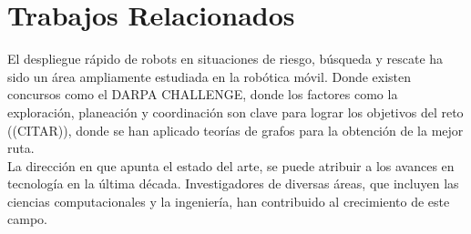 \documentclass[sigconf]{acmart}
\begin{document}

\section{Trabajos Relacionados}


El despliegue rápido de robots en situaciones de riesgo, búsqueda y rescate ha sido un área ampliamente estudiada en la robótica móvil. Donde existen concursos como el DARPA CHALLENGE, donde los factores como la exploración, planeación y coordinación son clave para lograr los objetivos del reto ((CITAR)), donde se han aplicado teorías de grafos para la obtención de la mejor ruta.\\


La dirección en que apunta el estado del arte, se puede atribuir a los avances en tecnología en la última década. Investigadores de diversas áreas, que incluyen las ciencias computacionales y la ingeniería, han contribuido al crecimiento de este campo.\\
\end{document}
